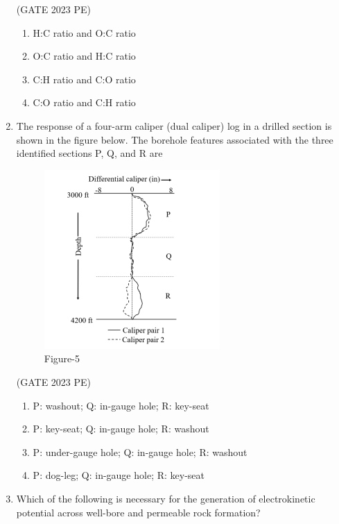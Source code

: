 \documentclass[journal,12pt,onecolumn]{exam}
\theoremstyle{remark}
\begin{document}
\begin{enumerate}
\hfill{(GATE 2023 PE)}\\
\begin{enumerate}
    \item H:C ratio and O:C ratio
    \item O:C ratio and H:C ratio
    \item C:H ratio and C:O ratio
    \item C:O ratio and C:H ratio
\end{enumerate}
\item The response of a four-arm caliper (dual caliper) log in a drilled section is shown in
the figure below. The borehole features associated with the three identified sections
P, Q, and R are
\begin{figure}[H]
    \centering
    \includegraphics[width=0.5\linewidth]{figs/fig5.png}
    \caption{Figure-5}
    \label{fig:figs/fig5.png}
\end{figure}

\hfill{(GATE 2023 PE)}\\
\begin{enumerate}
    \item P: washout; Q: in-gauge hole; R: key-seat
    \item P: key-seat; Q: in-gauge hole; R: washout
    \item P: under-gauge hole; Q: in-gauge hole; R: washout
    \item P: dog-leg; Q: in-gauge hole; R: key-seat
\end{enumerate}
\item Which of the following is necessary for the generation of electrokinetic potential
across well-bore and permeable rock formation?


\end{enumerate}
\end{document}
